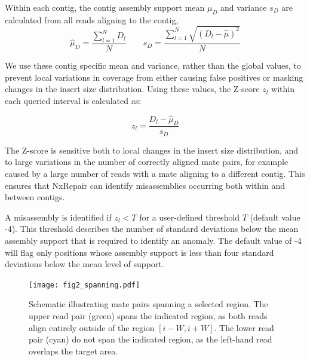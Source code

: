 \documentclass[fleqn,10pt]{wlpeerj}
\begin{document}
Within each contig, the contig assembly support mean $\mu_D$ and variance $s_D$ are calculated from all reads aligning to the contig,
\begin{equation}
\hat{\mu}_D = \frac{\sum_{l=1}^N D_l}{N} \qquad s_D = \frac{\sum_{l=1}^N \sqrt{(D_l - \hat{\mu})^2}}{N}
\label{eq:contigD}
\end{equation}

We use these contig specific mean and variance, rather than the global values, to prevent local variations in coverage from either causing false positives or masking changes in the insert size distribution. Using these values, the Z-score $z_l$ within each queried interval is calculated as: 

\begin{equation}
z_l = \frac{D_l - \hat{\mu}_D}{s_D}
\label{eq:zscore}
\end{equation}

The Z-score is sensitive both to local changes in the insert size distribution, and to large variations in the number of correctly aligned mate pairs, for example caused by a large number of reads with a mate aligning to a different contig. This ensures that NxRepair can identify misassemblies occurring both within and between contigs.  

A misassembly is identified if $z_l < T$ for a user-defined threshold $T$ (default value -4). This threshold describes the number of standard deviations below the mean assembly support that is required to identify an anomaly. The default value of -4 will flag only positions whose assembly support is less than four standard deviations below the mean level of support.

\begin{figure}
\centerline{\texttt{[image: fig2\_spanning.pdf]}}
\caption{Schematic illustrating mate pairs spanning a selected region. The upper read pair (green) spans the indicated region, as both reads align entirely outside of the region $[i-W, i+W]$. The lower read pair (cyan) do not span the indicated region, as the left-hand read overlaps the target area. \label{fig:spanning}}
\end{figure}
\end{document}
